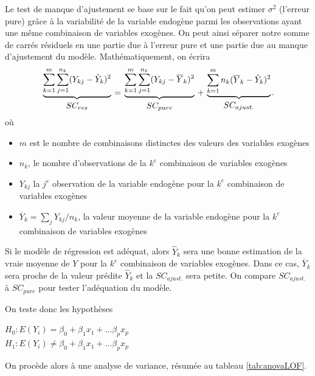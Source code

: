 Le test de manque d'ajustement se base sur le fait qu'on peut estimer $\sigma^2$ (l'erreur pure) gr\^ace à la variabilité de la variable endogène parmi les observations ayant une m\^eme combinaison de variables exogènes. On peut ainsi séparer notre somme de carrés résiduels en une partie due à l'erreur pure et une partie due au manque d'ajustement du modèle. Mathématiquement, on écrira
$$
{\underbrace{\sum_{k=1}^m\sum_{j=1}^{n_k}(Y_{kj}-\hat{Y}_k)^2}\atop
SC_{res}}={\underbrace{\sum_{k=1}^m\sum_{j=1}^{n_k}(Y_{kj}-\overline{Y}_k)^2}
\atop
SC_{pure}}+{\underbrace{\sum_{k=1}^mn_k(\overline{Y}_k-\hat{Y}_k)^2}
\atop SC_{ajust.}}.$$
o\`u
\begin{itemize}
\item[$\bullet$] $m$ est le nombre de combinaisons distinctes des valeurs des variables exogènes
\item[$\bullet$] $n_k$, le nombre d'observations de la $k^e$ combinaison de variables exogènes
\item[$\bullet$] $Y_{kj}$ la $j^e$ observation de la variable endogène pour la $k^e$ combinaison de variables exogènes
\item[$\bullet$] $\overline{Y}_k=\sum_jY_{kj}/{n_k}$, la valeur moyenne de la variable
endogène pour la $k^e$ combinaison de variables exogènes
\end{itemize}





Si le modèle de régression est adéquat, alors $\hat{Y}_k$ sera une bonne estimation de la vraie moyenne de $Y$ pour la $k^e$ combinaison de variables exogènes. Dans ce cas, $\overline{Y}_k$ sera proche de la valeur prédite $\hat{Y}_k$ et la $SC_{ajust.}$ sera petite. On compare $SC_{ajust.}$ à $SC_{pure}$ pour tester l'adéquation du modèle.

On teste donc les hypothèses

$H_0 : E(Y_i) = \beta_0 + \beta_1 x_1 + \ldots \beta_p x_p$ \\
$H_1 : E(Y_i) \ne \beta_0 + \beta_1 x_1 + \ldots \beta_p x_p$

On procède alors à une analyse de variance, résumée au tableau \ref{tab:anovaLOF}.

